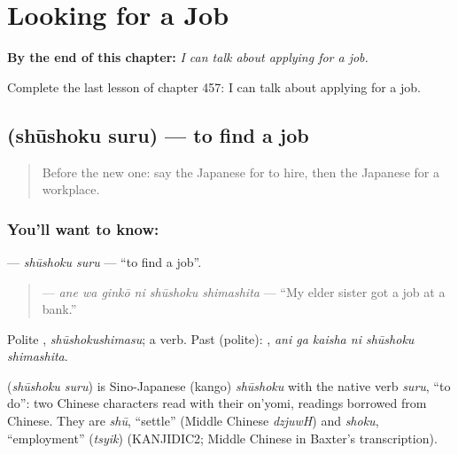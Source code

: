 
\chapter{Looking for a Job}
\label{ch:ja-looking-for-a-job}

\begin{chapteropening}
\textbf{By the end of this chapter:} \emph{I can talk about applying for a job.}

Complete the last lesson of chapter 457: I can talk about applying for a job.
\end{chapteropening}

\section[\texorpdfstring{\ja{しゅうしょくする} (shūshoku suru)}{しゅうしょくする (shūshoku suru)}]{ (shūshoku suru) — to find a job}

\label{lesson:JA-C457-shuushoku-suru}



\begin{quote}
Before the new one: say the Japanese for to hire, then the Japanese for a workplace.
\end{quote}

\subsection*{You'll want to know: }
\textbf{} — \emph{shūshoku suru} — \textquotedblleft{}to find a job\textquotedblright{}.

\begin{quote}
\textbf{  } — \emph{ane wa ginkō ni shūshoku shimashita} — \textquotedblleft{}My elder sister got a job at a bank.\textquotedblright{}
\end{quote}

Polite \textbf{}, \emph{shūshokushimasu}; a  verb. Past (polite): \textbf{  }, \emph{ani ga kaisha ni shūshoku shimashita}.

\begin{cousinweb}
\textbf{} (\emph{shūshoku suru}) is Sino-Japanese (kango) \emph{shūshoku} with the native verb \emph{suru}, \textquotedblleft{}to do\textquotedblright{}: two Chinese characters read with their on'yomi, readings borrowed from Chinese. They are \emph{shū}, \textquotedblleft{}settle\textquotedblright{} (Middle Chinese \emph{dzjuwH}) and \emph{shoku}, \textquotedblleft{}employment\textquotedblright{} (\emph{tsyik}) (KANJIDIC2; Middle Chinese in Baxter's transcription).
\end{cousinweb}

